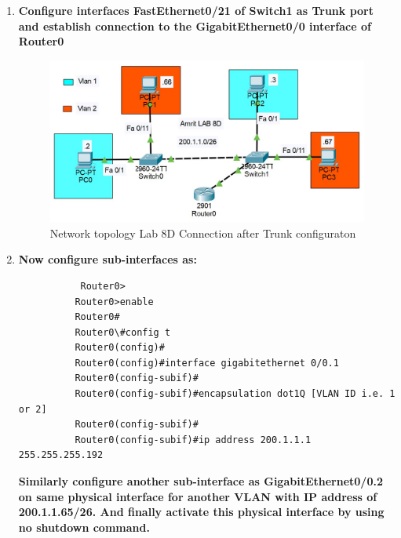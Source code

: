 \documentclass[a4paper,11pt]{article}
\begin{document}
\begin{enumerate}
    \item\textbf{ Configure interfaces FastEthernet0/21 of Switch1 as Trunk port and establish connection
              to the GigabitEthernet0/0 interface of Router0}



          \begin{figure}[H]
              \centering
              \includegraphics[scale=0.67,cframe=blue 0.5pt 3pt]{./FIG/Lab8D1.jpg}
              \caption{Network topology Lab 8D Connection after Trunk configuraton}
          \end{figure}

    \item\textbf{ Now configure sub-interfaces as:}
          \begin{verbatim}
           Router0>
          Router0>enable
          Router0#
          Router0\#config t
          Router0(config)#
          Router0(config)#interface gigabitethernet 0/0.1
          Router0(config-subif)#
          Router0(config-subif)#encapsulation dot1Q [VLAN ID i.e. 1 or 2]
          Router0(config-subif)#
          Router0(config-subif)#ip address 200.1.1.1 255.255.255.192
        \end{verbatim}
          \textbf{Similarly configure another sub-interface as GigabitEthernet0/0.2 on same physical
              interface for another VLAN with IP address of 200.1.1.65/26. And finally activate
              this physical interface by using no shutdown command.}





\end{enumerate}
\end{document}
